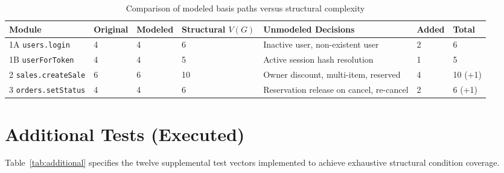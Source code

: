 \documentclass[12pt, a4paper]{report}
\begin{document}
\begin{table}[H]
\centering
\footnotesize
\begin{tabularx}{\textwidth}{L{3.5cm} C{1.8cm} C{1.8cm} C{2.2cm} L{3.5cm} C{1.5cm} C{1.5cm}}
\toprule
\textbf{Module} & \textbf{Original} & \textbf{Modeled} & \textbf{Structural $V(G)$} & \textbf{Unmodeled Decisions} & \textbf{Added} & \textbf{Total} \\
\midrule
1A \texttt{users.login} & 4 & 4 & 6 & Inactive user, non-existent user & 2 & 6 \\
1B \texttt{userForToken} & 4 & 4 & 5 & Active session hash resolution & 1 & 5 \\
2 \texttt{sales.createSale} & 6 & 6 & 10 & Owner discount, multi-item, reserved & 4 & 10 (+1) \\
3 \texttt{orders.setStatus} & 4 & 4 & 6 & Reservation release on cancel, re-cancel & 2 & 6 (+1) \\
\bottomrule
\end{tabularx}
\caption{Comparison of modeled basis paths versus structural complexity}
\label{tab:comparison}
\end{table}

\section{Additional Tests (Executed)}
Table~\ref{tab:additional} specifies the twelve supplemental test vectors implemented to achieve exhaustive structural condition coverage.
\end{document}
